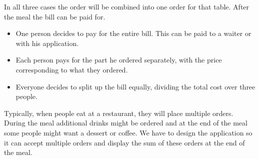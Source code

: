 \documentclass[12pt]{article}
\begin{document}
\noindent 
In all three cases the order will be combined into one order for that table. After the meal the bill can be paid for.

\begin{itemize}
	\item One person decides to pay for the entire bill. This can be paid to a waiter or with his application.
	\item Each person pays for the part he ordered separately, with the price corresponding to what they ordered.
	\item Everyone decides to split up the bill equally, dividing the total cost over three people. 
\end{itemize}

\noindent
Typically, when people eat at a restaurant, they will place multiple orders. During the meal additional drinks might be ordered and at the end of the meal some people might want a dessert or coffee. We have to design the application so it can accept multiple orders and display the sum of these orders at the end of the meal.
\end{document}
